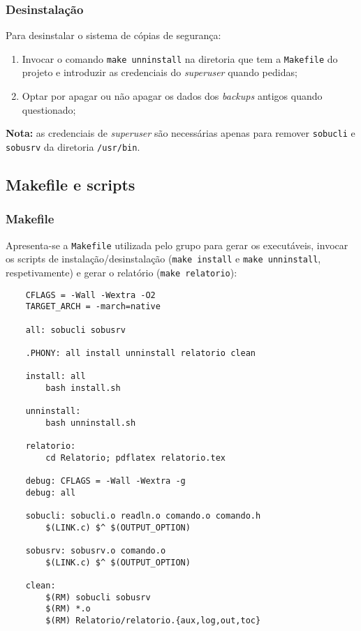 \documentclass[a4paper,12pt,titlepage,draft,portuguese]{article}
\begin{document}
\subsubsection{Desinstalação}

Para desinstalar o sistema de cópias de segurança:
	\begin{enumerate}
		\item Invocar o comando \texttt{make unninstall} na diretoria que tem a \texttt{Makefile} do projeto e introduzir as credenciais do \emph{superuser} quando pedidas;
		\item Optar por apagar ou não apagar os dados dos \emph{backups} antigos quando questionado;
	\end{enumerate}
\textbf{Nota:} as credenciais de \emph{superuser} são necessárias apenas para remover \texttt{sobucli} e \texttt{sobusrv} da diretoria \texttt{/usr/bin}.

\newpage

\subsection{Makefile e scripts}

\subsubsection{Makefile}
Apresenta-se a \texttt{Makefile} utilizada pelo grupo para gerar os executáveis, invocar os scripts de instalação/desinstalação (\texttt{make install} e \texttt{make unninstall}, respetivamente) e gerar o relatório (\texttt{make relatorio}):
	\begin{verbatim}
	CFLAGS = -Wall -Wextra -O2
	TARGET_ARCH = -march=native

	all: sobucli sobusrv

	.PHONY: all install unninstall relatorio clean

	install: all
		bash install.sh

	unninstall:
		bash unninstall.sh

	relatorio:
		cd Relatorio; pdflatex relatorio.tex

	debug: CFLAGS = -Wall -Wextra -g
	debug: all

	sobucli: sobucli.o readln.o comando.o comando.h
		$(LINK.c) $^ $(OUTPUT_OPTION)

	sobusrv: sobusrv.o comando.o
		$(LINK.c) $^ $(OUTPUT_OPTION)

	clean:
		$(RM) sobucli sobusrv
		$(RM) *.o
		$(RM) Relatorio/relatorio.{aux,log,out,toc}
	\end{verbatim}
\end{document}
